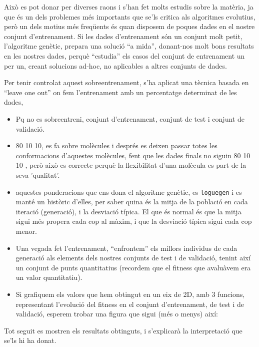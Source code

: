 Això es pot donar per diverses raons i s'han fet molts estudis sobre la
matèria, ja que és un dels problemes més importants que se'ls critica als
algoritmes evolutius, però un dels motius més freqüents és quan
disposem de poques dades en el nostre conjunt d'entrenament.  Si les dades
d'entrenament són un conjunt molt petit, l'algoritme genètic, prepara una
solució ``a mida'', donant-nos molt bons resultats en les nostres dades, perquè
``estudia'' els casos del conjunt de entrenament un per un, creant solucions
ad-hoc, no aplicables a altres conjunts de dades.

Per tenir controlat aquest sobreentrenament, s'ha aplicat una tècnica basada en
``leave one out'' on fem l'entrenament amb un percentatge determinat de les
dades, 

\begin{itemize}
	\item Pq no es sobreentreni, conjunt d'entrenament, conjunt de test i conjunt
		de validació.
	\item 80 10 10, es fa sobre molècules i després es deixen passar totes les
		conformacions d'aquestes molècules, fent que les dades finals no siguin 80 10 10
		, però això es correcte perquè la flexibilitat d'una molècula es part de la seva
		'qualitat'.
	\item aquestes ponderacions que ens dona el algoritme genètic, es
		\texttt{loguegen} i es manté un històric d'elles, per saber quina és la mitja
		de la població en cada iteració (generació), i la desviació típica.  El que
		és normal és que la mitja sigui més propera cada cop al màxim, i que la
		desviació típica sigui cada cop menor.
	\item Una vegada fet l'entrenament, ``enfrontem'' els millors individus de
	cada generació als elements dels nostres conjunts de test i de validació,
	tenint així un conjunt de punts quantitatius (recordem que el fitness que
	avaluàvem era un valor quantitatiu).
	\item Si grafiquem els valors que hem obtingut en un eix de 2D, amb 3
	funcions, representant l'evolució del fitness en el conjunt d'entrenament, de
	test i de validació, esperem trobar una figura que sigui (més o menys) així:
\end{itemize}
 
Tot seguit es mostren els resultats obtinguts, i s'explicarà la interpretació
que se'ls hi ha donat.


